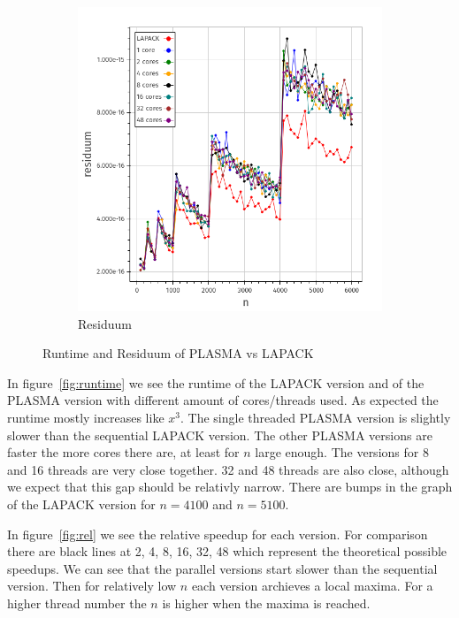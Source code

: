 \documentclass[a4paper,final,ngerman,english]{article}
\begin{document}
\begin{figure}[h!]
\begin{subfigure}{0.4\textwidth}
		\includegraphics[width=\textwidth]{res}
		\caption{Residuum}
\label{fig:residuum}
	\end{subfigure}
	\caption{Runtime and Residuum of PLASMA vs LAPACK}
\end{figure}

In figure~\ref{fig:runtime}
we see the runtime of the LAPACK version and of the PLASMA version with different amount of cores/threads used.
As expected the runtime mostly increases like \(x^3\).
The single threaded PLASMA version is slightly slower than the sequential LAPACK version.
The other PLASMA versions are faster the more cores there are, at least for $n$ large enough.
The versions for 8 and 16 threads are very close together. 32 and 48 threads are also close, although
we expect that this gap should be relativly narrow.
There are bumps in the graph of the LAPACK version for \(n = 4100\) and \(n = 5100 \).

In figure~\ref{fig:rel}
we see the relative speedup for each version.
For comparison there are black lines at 2, 4, 8, 16, 32, 48 which represent the theoretical possible speedups.
We can see that the parallel versions start slower than the sequential version.
Then for relatively low $n$ each version archieves a local maxima.
For a higher thread number the $n$ is higher when the maxima is reached. 
\end{document}
